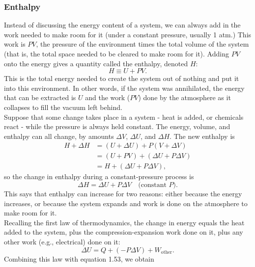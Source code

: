 \documentclass[11pt]{exam}
\begin{document}
\subsubsection*{Enthalpy}
Instead of discussing the energy content of a system, we can always add in the work needed to make room for it (under a constant pressure, usually 1 atm.) This work is $PV$, the pressure of the environment times the total volume of the system (that is, the total space needed to be cleared to make room for it). Adding $PV$ onto the energy gives a quantity called the enthalpy, denoted $H$:
\begin{equation}\tag{1.51}
H\equiv U + PV.    
\end{equation}
This is the total energy needed to create the system out of nothing and put it into this environment. In other words, if the system was annihilated, the energy that can be extracted is $U$ and the work ($PV$) done by the atmosphere as it collapses to fill the vacuum left behind.\\
\hspace*{10mm}Suppose that some change takes place in a system - heat is added, or chemicals react - while the pressure is always held constant. The energy, volume, and enthalpy can all change, by amounts $\Delta V$, $\Delta U$, and $\Delta H$. The new enthalpy is 
\begin{align*}\tag{1.52}
H+\Delta H &= (U + \Delta U) + P(V + \Delta V)\\
&= (U+PV) + (\Delta U + P\Delta V) \\
&= H + (\Delta U + P\Delta V),
\end{align*}
so the change in enthalpy during a constant-pressure process is 
\begin{equation}\tag{1.53}
\Delta H = \Delta U + P\Delta V\quad\text{(constant $P$).}
\end{equation}
This says that enthalpy can increase for two reasons: either because the energy increases, or because the system expands and work is done on the atmosphere to make room for it. \\
\hspace*{10mm}Recalling the first law of thermodynamics, the change in energy equals the heat added to the system, plus the compression-expansion work done on it, plus any other work (e.g., electrical) done on it:
\begin{equation}\tag{1.54}
    \Delta U = Q+(-P\Delta V) + W_{\text{other}}.
\end{equation}
Combining this law with equation 1.53, we obtain 
\end{document}
